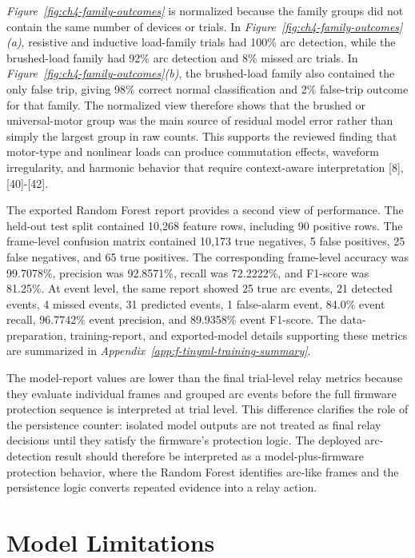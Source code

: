 \textit{Figure~\ref{fig:ch4-family-outcomes}} is normalized because the
family groups did not contain the same number of devices or trials. In
\textit{Figure~\ref{fig:ch4-family-outcomes}(a)}, resistive and inductive
load-family trials had 100\% arc detection, while the brushed-load family had
92\% arc detection and 8\% missed arc trials. In
\textit{Figure~\ref{fig:ch4-family-outcomes}(b)}, the brushed-load family
also contained the only false trip, giving 98\% correct normal classification
and 2\% false-trip outcome for that family. The normalized view therefore
shows that the brushed or universal-motor group was the main source of
residual model error rather than simply the largest group in raw counts. This
supports the reviewed finding that motor-type and nonlinear loads can produce
commutation effects, waveform irregularity, and harmonic behavior that require
context-aware interpretation [8], [40]-[42].

The exported Random Forest report provides a second view of performance. The
held-out test split contained 10,268 feature rows, including 90 positive rows.
The frame-level confusion matrix contained 10,173 true negatives, 5 false
positives, 25 false negatives, and 65 true positives. The corresponding
frame-level accuracy was 99.7078\%, precision was 92.8571\%, recall was
72.2222\%, and F1-score was 81.25\%. At event level, the same report showed
25 true arc events, 21 detected events, 4 missed events, 31 predicted events,
1 false-alarm event, 84.0\% event recall, 96.7742\% event precision, and
89.9358\% event F1-score. The data-preparation, training-report, and
exported-model details supporting these metrics are summarized in
\textit{Appendix~\ref{app:f-tinyml-training-summary}}.

The model-report values are lower than the final trial-level relay metrics
because they evaluate individual frames and grouped arc events before the full
firmware protection sequence is interpreted at trial level. This difference
clarifies the role of the persistence counter: isolated model outputs are not
treated as final relay decisions until they satisfy the firmware's protection
logic. The deployed arc-detection result should therefore be interpreted as a
model-plus-firmware protection behavior, where the Random Forest identifies
arc-like frames and the persistence logic converts repeated evidence into a
relay action.

\section{Model Limitations}
\label{sec:ch4-model-limitations}

